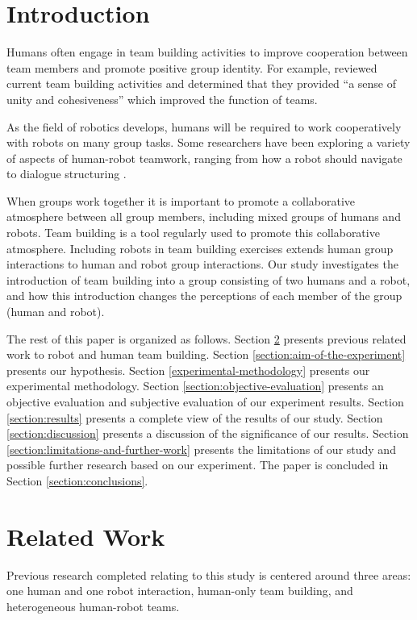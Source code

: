 \documentclass{acm_proc_article-sp}
\begin{document}


\section{Introduction}
\label{introduction}
Humans often engage in team building activities to improve cooperation between team members and promote positive group identity. For example, \cite{Rivas} reviewed current team building activities and determined that they provided ``a sense of unity and cohesiveness'' which improved the function of teams.

As the field of robotics develops, humans will be required to work cooperatively with robots on many group tasks. Some researchers have been exploring a variety of aspects of human-robot teamwork, ranging from how a robot should navigate \cite{Feil-Seifer} to dialogue structuring \cite{Fong}. 

When groups work together it is important to promote a collaborative atmosphere between all group members, including mixed groups of humans and robots. Team building is a tool regularly used to promote this collaborative atmosphere. Including robots in team building exercises extends human group interactions to human and robot group interactions. Our study investigates the introduction of team building into a group consisting of two humans and a robot, and how this introduction changes the perceptions of each member of the group (human and robot).

The rest of this paper is organized as follows. Section \ref{section:related-work} presents previous related work to robot and human team building. Section \ref{section:aim-of-the-experiment} presents our hypothesis. Section \ref{experimental-methodology} presents our experimental methodology. Section \ref{section:objective-evaluation} presents an objective evaluation and subjective evaluation of our experiment results. Section \ref{section:results} presents a complete view of the results of our study. Section \ref{section:discussion} presents a discussion of the significance of our results. Section \ref{section:limitations-and-further-work} presents the limitations of our study and possible further research based on our experiment. The paper is concluded in Section \ref{section:conclusions}.

\section{Related Work}
\label{section:related-work}
Previous research completed relating to this study is centered around three areas: one human and one robot interaction, human-only team building, and heterogeneous human-robot teams. 
\end{document}
